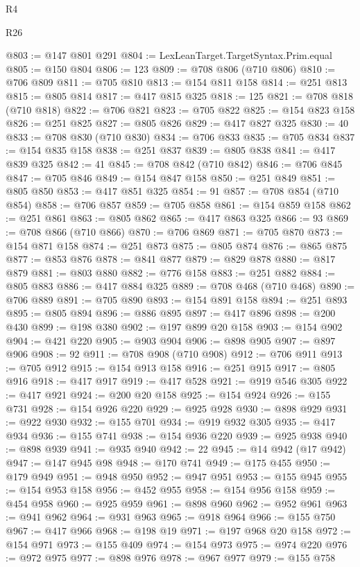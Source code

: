 \begin{lexlean}{R4}
\begin{lexlean}{R26}
\begin{coremodule}
{{{{{{{{{{{{{{{{{{{{{{{{{{{{{{{{{{{{{{{{{{{{{{{{{{{{{{{{{{{{{{{{{{{{{{{{@803 := @147 @801 @291
@804 := LexLeanTarget.TargetSyntax.Prim.equal
@805 := @150 @804
@806 := 123
@809 := @708 @806 (@710 @806)
@810 := @706 @809
@811 := @705 @810
@813 := @154 @811 @158
@814 := @251 @813
@815 := @805 @814
@817 := @417 @815 @325
@818 := 125
@821 := @708 @818 (@710 @818)
@822 := @706 @821
@823 := @705 @822
@825 := @154 @823 @158
@826 := @251 @825
@827 := @805 @826
@829 := @417 @827 @325
@830 := 40
@833 := @708 @830 (@710 @830)
@834 := @706 @833
@835 := @705 @834
@837 := @154 @835 @158
@838 := @251 @837
@839 := @805 @838
@841 := @417 @839 @325
@842 := 41
@845 := @708 @842 (@710 @842)
@846 := @706 @845
@847 := @705 @846
@849 := @154 @847 @158
@850 := @251 @849
@851 := @805 @850
@853 := @417 @851 @325
@854 := 91
@857 := @708 @854 (@710 @854)
@858 := @706 @857
@859 := @705 @858
@861 := @154 @859 @158
@862 := @251 @861
@863 := @805 @862
@865 := @417 @863 @325
@866 := 93
@869 := @708 @866 (@710 @866)
@870 := @706 @869
@871 := @705 @870
@873 := @154 @871 @158
@874 := @251 @873
@875 := @805 @874
@876 := @865 @875
@877 := @853 @876
@878 := @841 @877
@879 := @829 @878
@880 := @817 @879
@881 := @803 @880
@882 := @776 @158
@883 := @251 @882
@884 := @805 @883
@886 := @417 @884 @325
@889 := @708 @468 (@710 @468)
@890 := @706 @889
@891 := @705 @890
@893 := @154 @891 @158
@894 := @251 @893
@895 := @805 @894
@896 := @886 @895
@897 := @417 @896
@898 := @200 @430
@899 := @198 @380
@902 := @197 @899 @20 @158
@903 := @154 @902
@904 := @421 @220
@905 := @903 @904
@906 := @898 @905
@907 := @897 @906
@908 := 92
@911 := @708 @908 (@710 @908)
@912 := @706 @911
@913 := @705 @912
@915 := @154 @913 @158
@916 := @251 @915
@917 := @805 @916
@918 := @417 @917
@919 := @417 @528
@921 := @919 @546 @305
@922 := @417 @921
@924 := @200 @20 @158
@925 := @154 @924
@926 := @155 @731
@928 := @154 @926 @220
@929 := @925 @928
@930 := @898 @929
@931 := @922 @930
@932 := @155 @701
@934 := @919 @932 @305
@935 := @417 @934
@936 := @155 @741
@938 := @154 @936 @220
@939 := @925 @938
@940 := @898 @939
@941 := @935 @940
@942 := 22
@945 := @14 @942 (@17 @942)
@947 := @147 @945 @98
@948 := @170 @741
@949 := @175 @455
@950 := @179 @949
@951 := @948 @950
@952 := @947 @951
@953 := @155 @945
@955 := @154 @953 @158
@956 := @452 @955
@958 := @154 @956 @158
@959 := @454 @958
@960 := @925 @959
@961 := @898 @960
@962 := @952 @961
@963 := @941 @962
@964 := @931 @963
@965 := @918 @964
@966 := @155 @750
@967 := @417 @966
@968 := @198 @19
@971 := @197 @968 @20 @158
@972 := @154 @971
@973 := @155 @409
@974 := @154 @973
@975 := @974 @220
@976 := @972 @975
@977 := @898 @976
@978 := @967 @977
@979 := @155 @758
}}}}}}}}}}}}}}}}}}}}}}}}}}}}}}}}}}}}}}}}}}}}}}}}}}}}}}}}}}}}}}}}}}}}}}}}
\end{coremodule}
\end{lexlean}
\end{lexlean}
